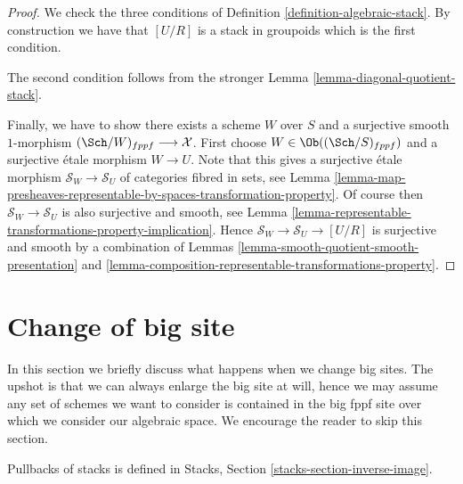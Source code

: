 \begin{proof}
We check the three conditions of
Definition \ref{definition-algebraic-stack}.
By construction we have that $[U/R]$ is a stack in groupoids
which is the first condition.

\medskip\noindent
The second condition follows from the stronger
Lemma \ref{lemma-diagonal-quotient-stack}.

\medskip\noindent
Finally, we have to show there exists a scheme $W$ over $S$
and a surjective smooth $1$-morphism
$(\Sch/W)_{fppf} \longrightarrow \mathcal{X}$.
First choose $W \in \Ob((\Sch/S)_{fppf})$ and a
surjective \'etale morphism $W \to U$. Note that this
gives a surjective \'etale morphism $\mathcal{S}_W \to \mathcal{S}_U$
of categories fibred in sets, see
Lemma
\ref{lemma-map-presheaves-representable-by-spaces-transformation-property}.
Of course then $\mathcal{S}_W \to \mathcal{S}_U$ is also surjective and
smooth, see
Lemma \ref{lemma-representable-transformations-property-implication}.
Hence $\mathcal{S}_W \to \mathcal{S}_U \to [U/R]$ is surjective
and smooth by a combination of
Lemmas \ref{lemma-smooth-quotient-smooth-presentation} and
\ref{lemma-composition-representable-transformations-property}.
\end{proof}





\section{Change of big site}
\label{section-change-big-site}

\noindent
In this section we briefly discuss what happens when we change big sites.
The upshot is that we can always enlarge the big site at will, hence we
may assume any set of schemes we want to consider is contained in the big
fppf site over which we consider our algebraic space.
We encourage the reader to skip this section.

\medskip\noindent
Pullbacks of stacks is defined in
Stacks, Section \ref{stacks-section-inverse-image}.


